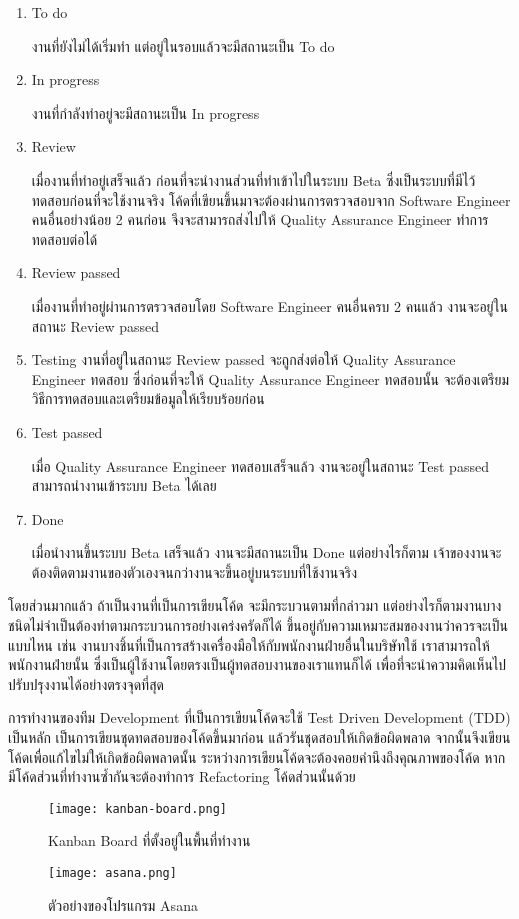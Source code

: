 \begin{enumerate}
	\item To do
	
	งานที่ยังไม่ได้เริ่มทำ แต่อยู่ในรอบแล้วจะมีสถานะเป็น To do
	
	\item In progress
	
	งานที่กำลังทำอยู่จะมีสถานะเป็น In progress
	
	\item Review
	
	เมื่องานที่ทำอยู่เสร็จแล้ว ก่อนที่จะนำงานส่วนที่ทำเข้าไปในระบบ Beta ซึ่งเป็นระบบที่มีไว้ทดสอบก่อนที่จะใช้งานจริง โค้ดที่เขียนขึ้นมาจะต้องผ่านการตรวจสอบจาก Software Engineer คนอื่นอย่างน้อย 2 คนก่อน จึงจะสามารถส่งไปให้ Quality Assurance Engineer ทำการทดสอบต่อได้
	
	\item Review passed
	
	เมื่องานที่ทำอยู่ผ่านการตรวจสอบโดย Software Engineer คนอื่นครบ 2 คนแล้ว งานจะอยู่ในสถานะ Review passed 
	
	\item Testing
	งานที่อยู่ในสถานะ Review passed จะถูกส่งต่อให้ Quality Assurance Engineer ทดสอบ ซึ่งก่อนที่จะให้ Quality Assurance Engineer ทดสอบนั้น จะต้องเตรียมวิธีการทดสอบและเตรียมข้อมูลให้เรียบร้อยก่อน
	
	\item Test passed
	
	เมื่อ Quality Assurance Engineer ทดสอบเสร็จแล้ว งานจะอยู่ในสถานะ Test passed สามารถนำงานเข้าระบบ Beta ได้เลย
	
	\item Done
	
	เมื่อนำงานขึ้นระบบ Beta เสร็จแล้ว งานจะมีสถานะเป็น Done แต่อย่างไรก็ตาม เจ้าของงานจะต้องติดตามงานของตัวเองจนกว่างานจะขึ้นอยู่บนระบบที่ใช้งานจริง
\end{enumerate}

โดยส่วนมากแล้ว ถ้าเป็นงานที่เป็นการเขียนโค้ด จะมีกระบวนตามที่กล่าวมา แต่อย่างไรก็ตามงานบางชนิดไม่จำเป็นต้องทำตามกระบวนการอย่างเคร่งครัดก็ได้ ขึ้นอยู่กับความเหมาะสมของงานว่าควรจะเป็นแบบไหน เช่น งานบางชิ้นที่เป็นการสร้างเครื่องมือให้กับพนักงานฝ่ายอื่นในบริษัทใช้ เราสามารถให้พนักงานฝ่ายนั้น ซึ่งเป็นผู้ใช้งานโดยตรงเป็นผู้ทดสอบงานของเราแทนก็ได้ เพื่อที่จะนำความคิดเห็นไปปรับปรุงงานได้อย่างตรงจุดที่สุด

การทำงานของทีม Development ที่เป็นการเขียนโค้ดจะใช้ Test Driven Development (TDD) เป็นหลัก เป็นการเขียนชุดทดสอบของโค้ดขึ้นมาก่อน แล้วรันชุดสอบให้เกิดข้อผิดพลาด จากนั้นจึงเขียนโค้ดเพื่อแก้ไขไม่ให้เกิดข้อผิดพลาดนั้น ระหว่างการเขียนโค้ดจะต้องคอยคำนึงถึงคุณภาพของโค้ด หากมีโค้ดส่วนที่ทำงานซ้ำกันจะต้องทำการ Refactoring โค้ดส่วนนั้นด้วย

\begin{figure}[!h]
	\centering
	\texttt{[image: kanban-board.png]}  
	\caption{Kanban Board ที่ตั้งอยู่ในพื้นที่ทำงาน}
	\label{Fig:kanban-board}
\end{figure}

\begin{figure}[!h]
	\centering
	\texttt{[image: asana.png]}  
	\caption{ตัวอย่างของโปรแกรม Asana}
	\label{Fig:asana}
\end{figure}